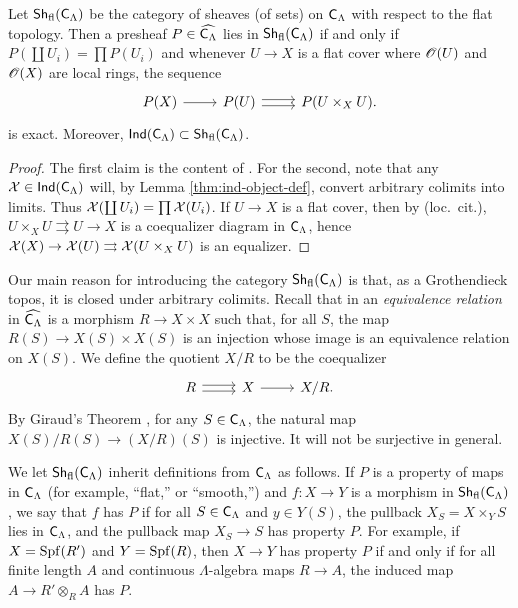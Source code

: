 \begin{lemma}
Let $\operatorname{\mathsf{Sh}}_{\mathrm{fl}}(\mathsf{C}_\Lambda)$ be the category of sheaves (of sets) on 
$\mathsf{C}_\Lambda$ with respect to the flat topology. Then a presheaf 
$P\in \widehat{\mathsf{C}_\Lambda}$ lies in $\operatorname{\mathsf{Sh}}_{\mathrm{fl}}(\mathsf{C}_\Lambda)$ if 
and only if $P(\coprod U_i) = \prod P(U_i)$ and whenever 
$U \to X$ is a flat cover where $\mathscr{O}(U)$ and $\mathscr{O}(X)$ are local rings, the 
sequence 
\[
\begin{tikzcd}
	P(X) \ar[r]
		& P(U) \ar[r, shift left=.5ex] \ar[r, shift right=.5ex]
		& P(U\times_X U) .
\end{tikzcd}
\]
is exact. Moreover, 
$\operatorname{\mathsf{Ind}}(\mathsf{C}_\Lambda)\subset \operatorname{\mathsf{Sh}}_{\mathrm{fl}}(\mathsf{C}_\Lambda)$. 
\end{lemma}
\begin{proof}
The first claim is the content of \cite[IV 6.3.1(ii)]{sga3-1}. For the second, 
note that any $\mathcal{X}\in \operatorname{\mathsf{Ind}}(\mathsf{C}_\Lambda)$ will, by Lemma 
\ref{thm:ind-object-def}, convert arbitrary colimits into limits. Thus 
$\mathcal{X}(\coprod U_i) = \prod \mathcal{X}(U_i)$. If $U\to X$ is a flat cover, then by (loc.~cit.), $U\times_X U\rightrightarrows U\to X$ is a coequalizer diagram in 
$\mathsf{C}_\Lambda$, hence 
$\mathcal{X}(X)\to \mathcal{X}(U)\rightrightarrows \mathcal{X}(U\times_X U)$ is an equalizer. 
\end{proof}

Our main reason for introducing the category $\operatorname{\mathsf{Sh}}_{\mathrm{fl}}(\mathsf{C}_\Lambda)$ 
is that, as a Grothendieck topos, it is closed under arbitrary colimits. 
Recall that in an \emph{equivalence relation} in $\widehat{\mathsf{C}_\Lambda}$ 
is a morphism $R\to X\times X$ such that, for all $S$, the map 
$R(S)\to X(S)\times X(S)$ is an injection whose image is an equivalence 
relation on $X(S)$. We define the quotient $X/R$ to be the coequalizer 
\[
\begin{tikzcd}
	R \ar[r, shift left=.5ex] \ar[r, shift right=.5ex]
		& X \ar[r]
		& X/R .
\end{tikzcd}
\]
By Giraud's Theorem \cite[App.]{maclane-moerdijk-1994}, for any 
$S\in \mathsf{C}_\Lambda$, the natural map $X(S)/R(S)\to (X/R)(S)$ is injective. 
It will not be surjective in general. 

We let $\operatorname{\mathsf{Sh}}_{\mathrm{fl}}(\mathsf{C}_\Lambda)$ inherit definitions from 
$\mathsf{C}_\Lambda$ as follows. If $P$ is a property of maps in 
$\mathsf{C}_\Lambda$ (for example, ``flat,'' or ``smooth,'') and 
$f\colon X\to Y$ is a morphism in $\operatorname{\mathsf{Sh}}_{\mathrm{fl}}(\mathsf{C}_\Lambda)$, we say 
that $f$ has $P$ if for all $S\in \mathsf{C}_\Lambda$ and $y\in Y(S)$, the 
pullback $X_S=X\times_Y S$ lies in $\mathsf{C}_\Lambda$, and the pullback map 
$X_S\to S$ has property $P$. For example, if $X=\operatorname{Spf}(R')$ and $Y=\operatorname{Spf}(R)$, then 
$X\to Y$ has property $P$ if and only if for all finite length $A$ and 
continuous $\Lambda$-algebra maps $R\to A$, the induced map 
$A\to R'\otimes_R A$ has $P$.


